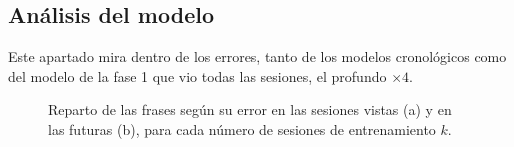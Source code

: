 \subsection{Análisis del modelo}
\label{sec:res-analisis}


Este apartado mira dentro de los errores, tanto de los modelos cronológicos como del modelo de la fase 1 que vio todas las sesiones, el profundo $\times 4$.


\begin{figure}[htbp]
  \centering
  \caption{Reparto de las frases según su error en las sesiones vistas (a) y en las futuras (b), para cada número de sesiones de entrenamiento $k$.}
  \label{fig:res-calidad}
\end{figure}


